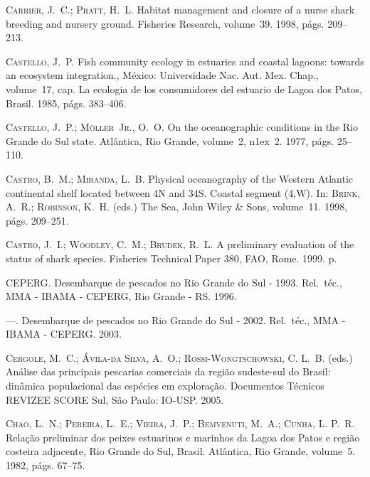 \documentclass[a4paper,11pt,twoside,showtrims,onecolumn,openright,final]{memoir}
\begin{document}
\begin{thebibliography}{194}
\textsc{Carrier, J.~C.; Pratt, H.~L.}
\newblock Habitat management and closure of a nurse shark breeding and nursery
  ground.
\newblock Fisheries Research, volume~39. 1998, p\'ags. 209--213.

\textsc{Castello, J.~P.}
\newblock Fish community ecology in estuaries and coastal lagoons: towards an
  ecosystem integration., M\'exico: Universidade Nac. Aut. Mex. Chap.,
  volume~17, cap. La ecologia de los consumidores del estuario de Lagoa dos
  Patos, Brasil. 1985, p\'ags. 383--406.

\textsc{Castello, J.~P.; Möller~Jr., O.~O.}
\newblock On the oceanographic conditions in the {R}io {G}rande do {S}ul state.
\newblock Atlântica, Rio Grande, volume~2,
  n\raise1ex\hbox{}~2. 1977, p\'ags. 25--110.

\textsc{Castro, B.~M.; Miranda, L.~B.}
\newblock Physical oceanography of the {W}estern {A}tlantic continental shelf
  located between 4{N} and 34{S}. {C}oastal segment (4,{W}).
\newblock In: \textsc{Brink, A.~R.; Robinson, K.~H.} (eds.) The {S}ea, John
  Wiley \& Sons, volume~11. 1998, p\'ags. 209--251.

\textsc{Castro, J.~I.; Woodley, C.~M.; Brudek, R.~L.}
\newblock A preliminary evaluation of the status of shark species.
\newblock Fisheries Technical Paper 380, FAO, Rome. 1999.
 p.

\textsc{CEPERG}.
\newblock Desembarque de pescados no {R}io {G}rande do {S}ul - 1993.
\newblock Rel.\ t\'ec., MMA - IBAMA - CEPERG, Rio Grande - RS. 1996.

---.
\newblock Desembarque de pescados no {R}io {G}rande do {S}ul - 2002.
\newblock Rel.\ t\'ec., MMA - IBAMA - CEPERG. 2003.

\textsc{Cergole, M.~C.; \'Avila-da Silva, A.~O.; Rossi-Wongtschowski, C. L.~B.}
  (eds.) An\'alise das principais pescarias comerciais da regi\~ao sudeste-sul
  do {B}rasil: din\^amica populacional das esp\'ecies em explora\c{c}\~ao.
\newblock Documentos T\'ecnicos REVIZEE SCORE Sul, S\~ao Paulo: IO-USP. 2005.

\textsc{Chao, L.~N.; Pereira, L.~E.; Vieira, J.~P.; Bemvenuti, M.~A.; Cunha, L.
  P.~R.}
\newblock Rela\c{c}\~ao preliminar dos peixes estuarinos e marinhos da {L}agoa
  dos {P}atos e regi\~ao costeira adjacente, {R}io {G}rande do {S}ul, {B}rasil.
\newblock Atl\^antica, Rio Grande, volume~5. 1982, p\'ags. 67--75.


\end{thebibliography}
\end{document}
